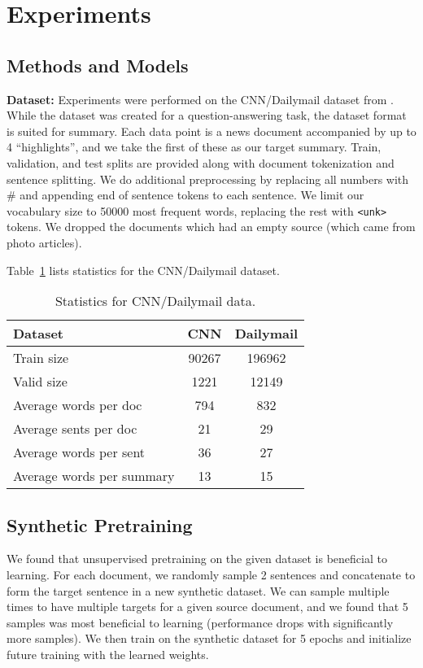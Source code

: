 \documentclass[11pt]{article}
\begin{document}
\section{Experiments}

\subsection{Methods and Models}

\noindent \textbf{Dataset:} Experiments were performed on the CNN/Dailymail dataset from \cite{hermann2015read}. While the dataset was created for a question-answering task, the dataset format is suited for summary. Each data point is a news document accompanied by up to 4 ``highlights'', and we take the first of these as our target summary. Train, validation, and test splits are provided along with document tokenization and sentence splitting. We do additional preprocessing by replacing all numbers with \# and appending end of sentence tokens to each sentence. We limit our vocabulary size to 50000 most frequent words, replacing the rest with \texttt{<unk>} tokens. We dropped the documents which had an empty source (which came from photo articles).

 Table~\ref{data_stats} lists statistics for the CNN/Dailymail dataset.

\begin{table}[h]
\centering
\begin{tabular}{lcc}
\toprule
Dataset  & CNN & Dailymail \\
\midrule
Train size & 90267 & 196962 \\
Valid size & 1221 & 12149 \\
Average words per doc & 794 & 832\\
Average sents per doc & 21 & 29\\
Average words per sent & 36 & 27\\
Average words per summary & 13 & 15 \\
\bottomrule
\end{tabular}
\caption{Statistics for CNN/Dailymail data.}
\label{data_stats}
\end{table}


\subsection{Synthetic Pretraining}

We found that unsupervised pretraining on the given dataset is beneficial to learning. For each document, we randomly sample 2 sentences and concatenate to form the target sentence in a new synthetic dataset. We can sample multiple times to have multiple targets for a given source document, and we found that 5 samples was most beneficial to learning (performance drops with significantly more samples). We then train on the synthetic dataset for 5 epochs and initialize future training with the learned weights.
\end{document}
